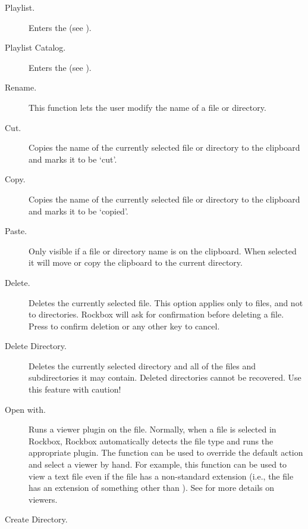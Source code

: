 \begin{description}
\item [Playlist.]
  Enters the  (see ).
\item [Playlist Catalog.]
  Enters the  (see 
  ).
\item [Rename.]
  This function lets the user modify the name of a file or directory.
\item [Cut.]
  Copies the name of the currently selected file or directory to the clipboard
  and marks it to be `cut'.
\item [Copy.]
  Copies the name of the currently selected file or directory to the clipboard
  and marks it to be `copied'.
\item [Paste.]
  Only visible if a file or directory name is on the clipboard. When selected
  it will move or copy the clipboard to the current directory.
\item [Delete.]
  Deletes the currently selected file. This option applies only to files, and
  not to directories. Rockbox will ask for confirmation before deleting a file.
  Press \ActionYesNoAccept{}
  to confirm deletion or any other key to cancel.
\item [Delete Directory.]
  Deletes the currently selected directory and all of the files and subdirectories
  it may contain. Deleted directories cannot be recovered. Use this feature with
  caution! 
\item [Open with.]
  Runs a viewer plugin on the file. Normally, when a file is selected in Rockbox,
  Rockbox automatically detects the file type and runs the appropriate plugin.
  The  function can be used to override the default action and
  select a viewer by hand.
  For example, this function can be used to view a text file
  even if the file has a non-standard extension (i.e., the file has an extension
  of something other than ). See 
  for more details on viewers. 
\item [Create Directory.]

\end{description}
